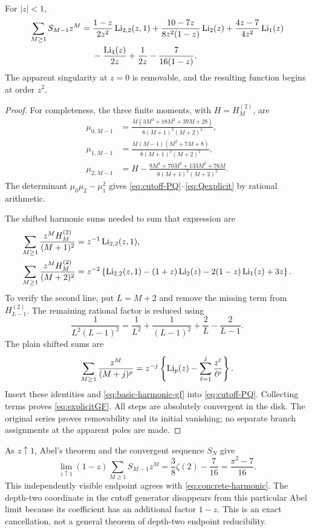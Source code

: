 \begin{theorem}\label{thm:explicitGF}
For $|z|<1$,
\begin{align}
 \sum_{M\ge1}S_{M-1}z^M
 ={}&\frac{1-z}{2z^2}\operatorname{Li}_{2,2}(z,1)
  +\frac{10-7z}{8z^2(1-z)}\operatorname{Li}_2(z)
  +\frac{4z-7}{4z^2}\operatorname{Li}_1(z)\notag\\
 &-\frac{\operatorname{Li}_4(z)}{2z}+\frac1{2z}-\frac7{16(1-z)}.
 \label{eq:explicitGF}
\end{align}
The apparent singularity at $z=0$ is removable, and the resulting
function begins at order $z^2$.
\end{theorem}
\begin{proof}
For completeness, the three finite moments, with $H=H_M^{(2)}$, are
\begin{align*}
 \mu_{0,M-1}&=\frac{M(3M^3+18M^2+39M+28)}{8(M+1)^2(M+2)^2},\\
 \mu_{1,M-1}&=\frac{M(M-1)(M^2+7M+8)}{8(M+1)^2(M+2)^2},\\
 \mu_{2,M-1}&=H-
  \frac{9M^4+70M^3+133M^2+76M}{8(M+1)^2(M+2)^2}.
\end{align*}
The determinant $\mu_0\mu_2-\mu_1^2$ gives
\eqref{eq:cutoff-PQ}--\eqref{eq:Qexplicit} by rational arithmetic.

The shifted harmonic sums needed to sum that expression are
\begin{align*}
 \sum_{M\ge1}\frac{z^M H_M^{(2)}}{(M+1)^2}
     &=z^{-1}\operatorname{Li}_{2,2}(z,1),\\
 \sum_{M\ge1}\frac{z^M H_M^{(2)}}{(M+2)^2}
     &=z^{-2}\left\{\operatorname{Li}_{2,2}(z,1)
          -(1+z)\operatorname{Li}_2(z)-2(1-z)\operatorname{Li}_1(z)+3z\right\}.
\end{align*}
To verify the second line, put $L=M+2$ and remove the missing term
from $H_{L-1}^{(2)}$. The remaining rational factor is reduced using
\[
 \frac1{L^2(L-1)^2}
 =\frac1{L^2}+\frac1{(L-1)^2}+\frac2L-\frac2{L-1}.
\]
The plain shifted sums are
\[
 \sum_{M\ge1}\frac{z^M}{(M+j)^p}
  =z^{-j}\left\{\operatorname{Li}_p(z)-\sum_{\ell=1}^{j}\frac{z^\ell}{\ell^p}\right\}.
\]
Insert these identities and \eqref{eq:basic-harmonic-gf} into
\eqref{eq:cutoff-PQ}. Collecting terms proves \eqref{eq:explicitGF}.
All steps are absolutely convergent in the disk. The original series
proves removability and its initial vanishing; no separate branch
assignments at the apparent poles are made.
\end{proof}

As $z\uparrow1$, Abel's theorem and the convergent sequence $S_N$ give
\begin{equation}\label{eq:AbelGF}
 \lim_{z\uparrow1}(1-z)\sum_{M\ge1}S_{M-1}z^M
     =\frac38\zeta(2)-\frac7{16}=\frac{\pi^2-7}{16}.
\end{equation}
This independently visible endpoint agrees with
\eqref{eq:concrete-harmonic}. The depth-two coordinate in the cutoff
generator disappears from this particular Abel limit because its
coefficient has an additional factor $1-z$. This is an exact cancellation,
not a general theorem of depth-two endpoint reducibility.

